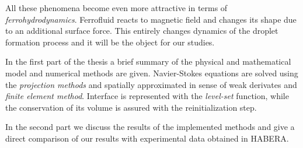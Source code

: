 \par All these phenomena become even more attractive in terms of \textit{ferrohydrodynamics}. Ferrofluid reacts to magnetic field and changes its shape due to an additional surface force. This entirely changes dynamics of the droplet formation process and it will be the object for our studies.

\par In the first part of the thesis a brief summary of the physical and mathematical model and numerical methods are given. Navier-Stokes equations are solved using the \textit{projection methods} and spatially approximated in sense of weak derivates and \textit{finite element method}. Interface is represented with the \textit{level-set} function, while the conservation of its volume is assured with the reinitialization step.  

\par In the second part we discuss the results of the implemented methods and give a direct comparison of our results with experimental data obtained in HABERA.
